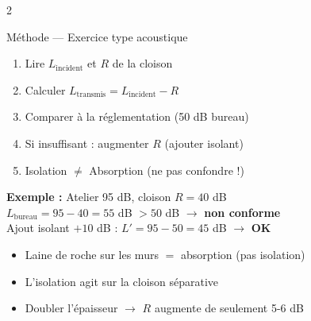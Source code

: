 \documentclass[a4paper,10pt]{article}
\begin{document}
\begin{multicols}{2}
\begin{methbox}{Méthode — Exercice type acoustique}
\begin{enumerate}[nosep,leftmargin=12pt]
  \item Lire $L_{\text{incident}}$ et $R$ de la cloison
  \item Calculer $L_{\text{transmis}} = L_{\text{incident}} - R$
  \item Comparer à la réglementation (50 dB bureau)
  \item Si insuffisant : augmenter $R$ (ajouter isolant)
  \item Isolation $\neq$ Absorption (ne pas confondre !)
\end{enumerate}
\end{methbox}

\begin{exbox}
\textbf{Exemple :} Atelier 95 dB, cloison $R = 40$ dB\\
$L_{\text{bureau}} = 95 - 40 = 55$ dB $> 50$ dB $\to$ \textbf{non conforme}\\[4pt]
Ajout isolant $+10$ dB : $L' = 95 - 50 = 45$ dB $\to$ \textbf{OK}
\end{exbox}

\begin{attbox}
\begin{itemize}[nosep,leftmargin=12pt]
  \item Laine de roche sur les murs $=$ absorption (pas isolation)
  \item L'isolation agit sur la cloison séparative
  \item Doubler l'épaisseur $\to$ $R$ augmente de seulement 5-6 dB
\end{itemize}
\end{attbox}

\end{multicols}
\end{document}
